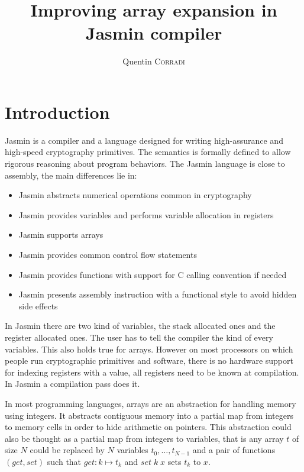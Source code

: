\documentclass{article}
\title{Improving array expansion in Jasmin compiler}
\author{Quentin \textsc{Corradi}}
\begin{document}
\maketitle

\section{Introduction}

Jasmin\cite{10.1145/3133956.3134078, 10.1145/3319535.3363211, 9152665} is a
compiler and a language designed for writing high-assurance and
high-speed cryptography primitives. The semantics is formally defined to allow
rigorous reasoning about program behaviors.
The Jasmin language is close to assembly, the main differences lie in:
\begin{itemize}
\item Jasmin abstracts numerical operations common in cryptography
\item Jasmin provides variables and performs variable allocation in registers
\item Jasmin supports arrays
\item Jasmin provides common control flow statements
\item Jasmin provides functions with support for C calling convention if needed
\item Jasmin presents assembly instruction with a functional style to avoid
hidden side effects
\end{itemize}

In Jasmin there are two kind of variables, the stack allocated ones and the
register allocated ones. The user has to tell the compiler the kind of every
variables. This also holds true for arrays. However on most processors on which
people run cryptographic primitives and software, there is no hardware support
for indexing registers with a value, all registers need to be known at
compilation. In Jasmin a compilation pass does it.

\medskip

In most programming languages, arrays are an abstraction for handling memory
using integers. It abstracts contiguous memory into a partial map from integers
to memory cells in order to hide arithmetic on pointers. This abstraction could
also be thought as a partial map from integers to variables, that is any array
\(t\) of size \(N\) could be replaced by \(N\) variables
\(t_0, \dots, t_{N - 1}\) and a pair of functions
\((\mathit{get}, \mathit{set})\) such that \(\mathit{get} : k \mapsto t_k\) and
\(\mathit{set}\;k\;x\) sets \(t_k\) to \(x\).
\end{document}
